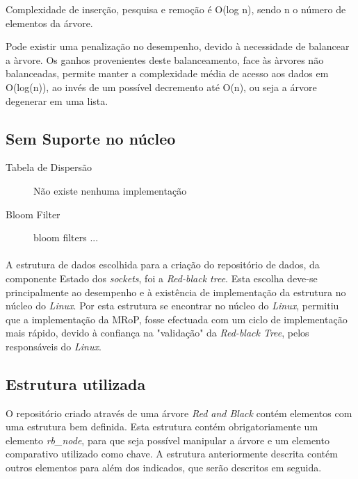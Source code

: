 \begin{description}
Complexidade de inserção, pesquisa e remoção é O(log n), sendo n o número de elementos da árvore.

Pode existir uma penalização no desempenho, devido à necessidade de balancear a àrvore.
Os ganhos provenientes deste balanceamento, face às àrvores não balanceadas, permite manter a complexidade média de acesso aos dados em O(log(n)), ao invés de um possível decremento até O(n), ou seja a árvore degenerar em uma lista.
\end{description}

\subsection{Sem Suporte no núcleo}

\begin{description}
\item[Tabela de Dispersão]
Não existe nenhuma implementação 

\item[Bloom Filter]
bloom filters ...

\end{description}
\paragraph*{}
A estrutura de dados escolhida para a criação do repositório de dados, da componente Estado dos \textit{sockets}, foi a \textit{Red-black tree}.
 Esta escolha deve-se principalmente ao desempenho e à existência de implementação da estrutura no núcleo do \textit{Linux}.
 Por esta estrutura se encontrar no núcleo do \textit{Linux}, permitiu que a implementação da MRoP, fosse efectuada com um ciclo de implementação mais rápido, devido à confiança na "validação" da \textit{Red-black Tree}, pelos responsáveis do \textit{Linux}.
 
\subsection{Estrutura utilizada}
\label{sub:repo_structure}

O repositório criado através de uma árvore \textit{Red and Black} contém elementos com uma estrutura bem definida.
Esta estrutura contém obrigatoriamente um elemento \textit{rb\_node}, para que seja possível manipular a árvore e um elemento comparativo utilizado como chave.
A estrutura anteriormente descrita contém outros elementos para além dos indicados, que serão descritos em seguida.

